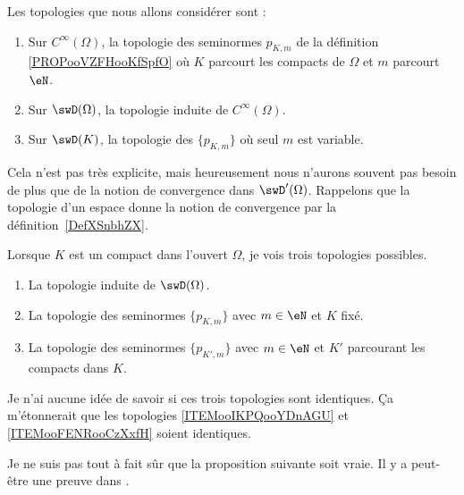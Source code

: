 \begin{definition}  \label{DefFGGCooTYgmYf}
	Les topologies que nous allons considérer sont :
	\begin{enumerate}
		\item
		      Sur \(  C^{\infty}(\Omega)\), la topologie des seminormes \( p_{K,m}\) de la définition \ref{PROPooVZFHooKfSpfO} où \( K\) parcourt les compacts de \( \Omega\) et \( m\) parcourt \( \eN\).

		\item       \label{ITEMooIZWSooOoIVWx}
		      Sur \( \swD(\Omega)\), la topologie induite de \(  C^{\infty}(\Omega)\).
		\item
		      Sur \( \swD(K)\), la topologie des \( \{ p_{K,m} \}\) où seul \( m\) est variable.
	\end{enumerate}
\end{definition}

Cela n'est pas très explicite, mais heureusement nous n'aurons souvent pas besoin de plus que de la notion de convergence dans \( \swD'(\Omega)\). Rappelons que la topologie d'un espace donne la notion de convergence par la définition~\ref{DefXSnbhZX}.

\begin{probleme}
	Lorsque \( K\) est un compact dans l'ouvert \( \Omega\), je vois trois topologies possibles.
	\begin{enumerate}
		\item
		      La topologie induite de \( \swD(\Omega)\).
		\item       \label{ITEMooIKPQooYDnAGU}
		      La topologie des seminormes \( \{ p_{K,m} \}\) avec \( m\in \eN\) et \( K\) fixé.
		\item       \label{ITEMooFENRooCzXxfH}
		      La topologie des seminormes \( \{ p_{K',m} \}\) avec \( m\in \eN\) et \( K'\) parcourant les compacts dans \( K\).
	\end{enumerate}
	Je n'ai aucune idée de savoir si ces trois topologies sont identiques. Ça m'étonnerait que les topologies \ref{ITEMooIKPQooYDnAGU} et \ref{ITEMooFENRooCzXxfH} soient identiques.
\end{probleme}

\begin{probleme}
	Je ne suis pas tout à fait sûr que la proposition suivante soit vraie. Il y a peut-être une preuve dans \cite{TQSWRiz}.
\end{probleme}

